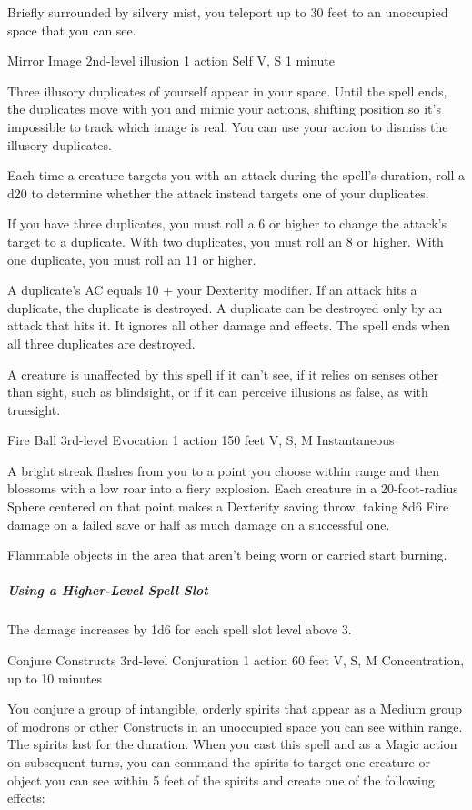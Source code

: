 \documentclass[letterpaper,openany,oneside,twocolumn]{book}
\begin{document}
Briefly surrounded by silvery mist, you teleport up to 30 feet to an unoccupied space that you can see.

\DndSpellHeader
  {Mirror Image}
  {2nd-level illusion }
  {1 action}
  {Self}
  {V, S}
  {1 minute}

Three illusory duplicates of yourself appear in your space. Until the spell ends, the duplicates move with you and mimic your actions, shifting position so it’s impossible to track which image is real. You can use your action to dismiss the illusory duplicates.

Each time a creature targets you with an attack during the spell’s duration, roll a d20 to determine whether the attack instead targets one of your duplicates.

If you have three duplicates, you must roll a 6 or higher to change the attack’s target to a duplicate. With two duplicates, you must roll an 8 or higher. With one duplicate, you must roll an 11 or higher.

A duplicate’s AC equals 10 + your Dexterity modifier. If an attack hits a duplicate, the duplicate is destroyed. A duplicate can be destroyed only by an attack that hits it. It ignores all other damage and effects. The spell ends when all three duplicates are destroyed.

A creature is unaffected by this spell if it can’t see, if it relies on senses other than sight, such as blindsight, or if it can perceive illusions as false, as with truesight.

\DndSpellHeader
  {Fire Ball}
  {3rd-level Evocation }
  {1 action}
  {150 feet}
  {V, S, M}
  {Instantaneous}

A bright streak flashes from you to a point you choose within range and then blossoms with a low roar into a fiery explosion. Each creature in a 20-foot-radius Sphere centered on that point makes a Dexterity saving throw, taking 8d6 Fire damage on a failed save or half as much damage on a successful one.

Flammable objects in the area that aren't being worn or carried start burning.

\subparagraph*{Using a Higher-Level Spell Slot} The damage increases by 1d6 for each spell slot level above 3.

\DndSpellHeader
  {Conjure Constructs}
  {3rd-level Conjuration }
  {1 action}
  {60 feet}
  {V, S, M}
  {Concentration, up to 10 minutes}

You conjure a group of intangible, orderly spirits that appear as a Medium group of modrons or other Constructs in an unoccupied space you can see within range. The spirits last for the duration. When you cast this spell and as a Magic action on subsequent turns, you can command the spirits to target one creature or object you can see within 5 feet of the spirits and create one of the following effects:
\end{document}
